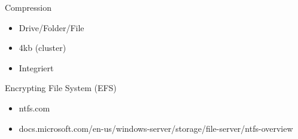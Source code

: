 \documentclass[12pt]{beamer}
\begin{document}
\begin{frame}{Compression}
\begin{itemize}
\item Drive/Folder/File
\item 4kb (cluster)
\item Integriert
\end{itemize}
\end{frame}

\begin{frame}{Encrypting File System (EFS)}

\end{frame}

\begin{frame}
\small
\begin{itemize}
\small
\item ntfs.com
\item docs.microsoft.com/en-us/windows-server/storage/file-server/ntfs-overview
\end{itemize}
\end{frame}
\end{document}
